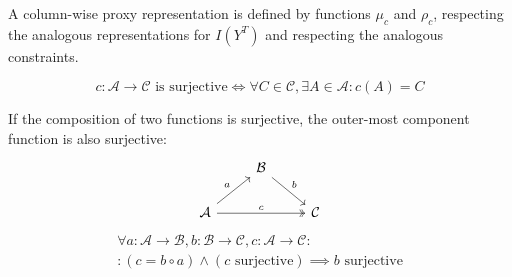 \begin{appendices}

A column-wise proxy representation is defined by functions $\mu_c$ and $\rho_c$, respecting the analogous representations for $I(Y^T)$ and respecting the analogous constraints.





\begin{definition}[Surjectivity]
\[
    c\colon \mathcal{A} \to \mathcal{C} \text{ is surjective} \iff \forall C \in \mathcal{C},\exists A \in \mathcal{A} : c(A) = C
\]
\end{definition}

\begin{lemma}
\label{lemma:surj}

If the composition of two functions is surjective, the outer-most component function is also surjective:
\begin{equation}
  \begin{tikzcd}
    & \mathcal{B} \arrow{dr}{b} &
    \\
    \mathcal{A} \arrow{ur}{a} \arrow[two heads]{rr}{c} & & \mathcal{C}
  \end{tikzcd}
\end{equation}
\begin{multline}
    \forall a: \mathcal{A} \to \mathcal{B}, b: \mathcal{B} \to \mathcal{C}, c: \mathcal{A} \to \mathcal{C}:
    \\
    :(c = b \circ a) \land (c \text{ surjective}) \implies b \text{ surjective}
\end{multline}
\end{lemma}


\end{appendices}
